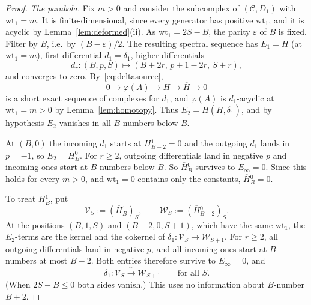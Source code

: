\documentclass[11pt]{amsart}
\numberwithin{equation}{section}
\theoremstyle{definition}
\theoremstyle{remark}
\newcommand{\cC}{\mathcal{C}}
\newcommand{\wt}{\mathrm{wt}}
\newcommand{\Hb}{\overline{H}}
\begin{document}
\begin{proof}
\emph{The parabola.} Fix $m>0$ and consider the subcomplex of $(\cC,D_1)$ with $\wt_1=m$. It is finite-dimensional, since every generator has positive $\wt_1$, and it is acyclic by Lemma~\ref{lem:deformed}(ii). As $\wt_1=2S-B$, the parity $\varepsilon$ of $B$ is fixed. Filter by $B$, i.e.\ by $(B-\varepsilon)/2$. The resulting spectral sequence has $E_1=H$ (at $\wt_1=m$), first differential $d_1=\delta_1$, higher differentials
\begin{equation}\label{eq:dr-parabola}
d_r:(B,p,S)\longmapsto(B+2r,\,p+1-2r,\,S+r),
\end{equation}
and converges to zero. By~\eqref{eq:deltasource},
\begin{equation}\label{eq:Hbar-ses}
0\longrightarrow\varphi(A)\longrightarrow H\longrightarrow\Hb\longrightarrow0
\end{equation}
is a short exact sequence of complexes for $d_1$, and $\varphi(A)$ is $d_1$-acyclic at $\wt_1=m>0$ by Lemma~\ref{lem:homotopy}. Thus $E_2=H(\Hb,\delta_1)$, and by hypothesis $E_2$ vanishes in all $B$-numbers below $B$.

At $(B,0)$ the incoming $d_1$ starts at $\Hb{}^1_{B-2}=0$ and the outgoing $d_1$ lands in $p=-1$, so $E_2=\Hb{}_B^0$. For $r\ge2$, outgoing differentials land in negative $p$ and incoming ones start at $B$-numbers below $B$. So $\Hb{}_B^0$ survives to $E_\infty=0$. Since this holds for every $m>0$, and $\wt_1=0$ contains only the constants, $\Hb{}_B^0=0$.

To treat $\Hb{}_B^1$, put
\begin{equation}\label{eq:VW}
\mathcal V_S:=(\Hb{}_B^1)_S,\qquad \mathcal W_S:=(\Hb{}_{B+2}^0)_S .
\end{equation}
At the positions $(B,1,S)$ and $(B+2,0,S+1)$, which have the same $\wt_1$, the $E_2$-terms are the kernel and the cokernel of $\delta_1:\mathcal V_S\to\mathcal W_{S+1}$. For $r\ge2$, all outgoing differentials land in negative $p$, and all incoming ones start at $B$-numbers at most $B-2$. Both entries therefore survive to $E_\infty=0$, and
\begin{equation}\label{eq:firstshift}
\delta_1:\mathcal V_S\xrightarrow{\ \sim\ }\mathcal W_{S+1}\qquad\text{for all }S.
\end{equation}
(When $2S-B\le0$ both sides vanish.) This uses no information about $B$-number $B+2$.


\end{proof}
\end{document}
